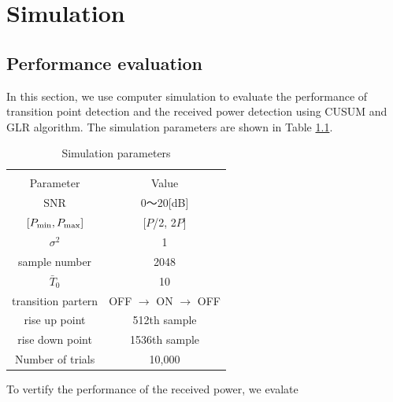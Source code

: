 \chapter[Simulation]{Simulation}
\label{chapter:Result}



\section{Performance evaluation}
In this section, we use computer simulation to evaluate the performance of transition point detection and the received power detection using CUSUM and GLR algorithm. The simulation parameters are shown in Table \ref{parameter}.

\begin{table}[!htp]
\begin{center}
 \caption{\normalsize{Simulation parameters}}
 
\normalsize

  \begin{tabular}{c|c}
    & \\
    Parameter &Value \\ \hline
    SNR & 0〜20[dB] \\
    $[P_{{\rm min}},P_{{\rm max}}]$ & [$P$/2, 2$P$] \\
    $\sigma^2$ & 1 \\
    sample number & 2048 \\
    $\bar{T}_0$ & 10 \\
    transition partern & OFF $\rightarrow$ ON $\rightarrow$ OFF \\
    rise up point & 512th sample\\
    rise down point & 1536th sample\\
    Number of trials & 10,000 \\ \hline
  \end{tabular}
\label{parameter}
\end{center}
\end{table}

To vertify the performance of the received power, we evalate

